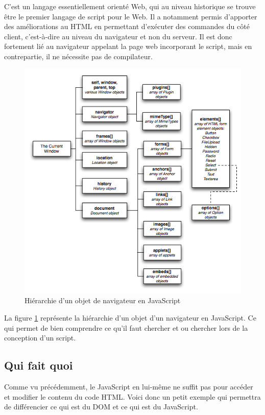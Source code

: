 \documentclass[10pt,a4paper,titlepage]{article}
\begin{document}
C'est un langage essentiellement orienté Web, qui au niveau historique se trouve être le premier langage de script pour le Web. Il a notamment permis d'apporter des améliorations au HTML en permettant d'exécuter des commandes du côté client, c'est-à-dire au niveau du navigateur et non du serveur. Il est donc fortement lié au navigateur appelant la page web incorporant le script, mais en contrepartie, il ne nécessite pas de compilateur.\\

\begin{figure}[h]
	\begin{center}
			\includegraphics[width=12cm]{img/schema_js.png}
			\caption{Hiérarchie d'un objet de navigateur en JavaScript}
			\label{schema}
	\end{center}
\end{figure}

La figure \ref{schema} représente la hiérarchie d'un objet d'un navigateur en JavaScript. Ce qui permet de bien comprendre ce qu'il faut chercher et ou chercher lors de la conception d'un script.

\subsection{Qui fait quoi}
% 
Comme vu précédemment, le JavaScript en lui-même ne suffit pas pour accéder et modifier le contenu du code HTML. Voici donc un petit exemple qui permettra de différencier ce qui est du DOM et ce qui est du JavaScript.
\end{document}
